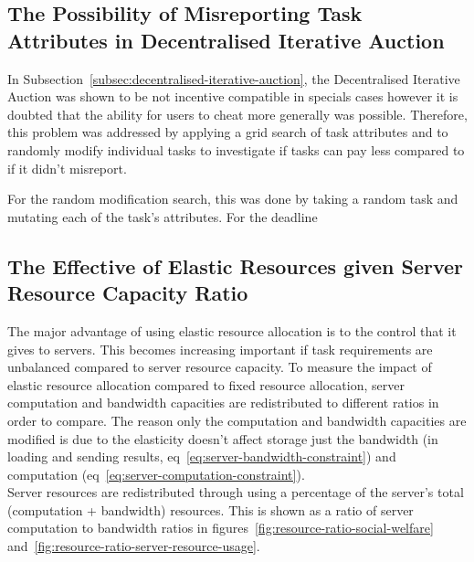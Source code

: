 \subsection{The Possibility of Misreporting Task Attributes in Decentralised Iterative Auction}
\label{subsec:possibility-of-misreporting-task-attributes-in-decentarlised-iterative-auction}
In Subsection~\ref{subsec:decentralised-iterative-auction}, the Decentralised Iterative Auction was shown to be not
incentive compatible in specials cases however it is doubted that the ability for users to cheat more generally was
possible. Therefore, this problem was addressed by applying a grid search of task attributes and to randomly modify
individual tasks to investigate if tasks can pay less compared to if it didn't misreport.

For the random modification search, this was done by taking a random task and mutating each of the task's attributes.
For the deadline

\subsection{The Effective of Elastic Resources given Server Resource Capacity Ratio}
\label{subsec:the-effective-of-elastic-resources-given-server-resource-capacity-ratio}
The major advantage of using elastic resource allocation is to the control that it gives to servers. This becomes
increasing important if task requirements are unbalanced compared to server resource capacity. To measure the impact
of elastic resource allocation compared to fixed resource allocation, server computation and bandwidth capacities
are redistributed to different ratios in order to compare. The reason only the computation and bandwidth capacities
are modified is due to the elasticity doesn't affect storage just the bandwidth (in loading and sending results,
eq~\ref{eq:server-bandwidth-constraint}) and computation (eq~\ref{eq:server-computation-constraint}). \\
Server resources are redistributed through using a percentage of the server's total (computation + bandwidth) resources.
This is shown as a ratio of server computation to bandwidth ratios in figures~\ref{fig:resource-ratio-social-welfare}
and~\ref{fig:resource-ratio-server-resource-usage}.

